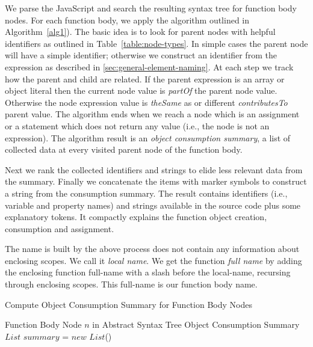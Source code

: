 \documentclass[10pt, preprint]{sigplanconf}
\begin{document}
{We parse the JavaScript and search the resulting syntax tree for function body nodes. For each function body, we apply the algorithm outlined in Algorithm~\ref{alg1}). The basic idea is to look for parent nodes with helpful identifiers as outlined in  Table~\ref{table:node-types}. In simple cases the parent node will have a simple identifier; otherwise we construct an identifier from the expression as described in \ref{sec:general-element-naming}.  At each step we track how the parent and child are related.  If the parent expression is an array or object literal then the current node value is \textit{partOf} the parent node value. Otherwise the node expression value is \textit{theSame} as or different \textit{contributesTo} parent value. The algorithm ends when we reach a node which is an assignment or a statement which does not return any value (i.e., the node is not an expression).  The algorithm result is an \textit{object consumption summary}, a list of collected data at every visited parent node of the function body.

Next we rank the collected identifiers and strings to elide less relevant data from the summary. Finally we concatenate the items with marker symbols to construct a string from the consumption summary. The result contains identifiers (i.e., variable and property names) and strings available in the source code plus some explanatory tokens. It compactly explains the function object creation, consumption and assignment.
 
The name is built by the above process does not contain any information about enclosing scopes. We call it \textit{local name}. We get the function \textit{full name} by adding the enclosing function full-name with a slash before the local-name, recursing through enclosing scopes. This full-name is our function body name.


\renewcommand{\algorithmicrequire}{\textbf{Input:}}
\renewcommand{\algorithmicensure}{\textbf{Output:}}

\begin{algorithm}                      %
\caption{Compute Object Consumption Summary for Function Body Nodes}          %
\label{alg1}                           %
\begin{algorithmic}                    %
\REQUIRE Function Body Node $n$ in Abstract Syntax Tree
\ENSURE Object Consumption Summary 
\STATE $List$ $summary$ = $new$ $List$()



\end{algorithmic}
\end{algorithm}}
\end{document}
